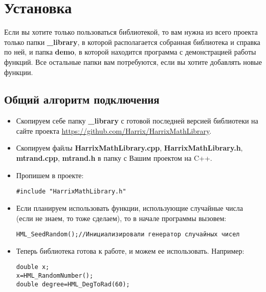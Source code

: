 \newpage
\section{Установка}\label{section_install}

Если вы хотите только пользоваться библиотекой, то вам нужна из всего проекта только папки \textbf{\_library}, в которой располагается собранная библиотека и справка по ней, и папка \textbf{demo}, в которой находится программа с демонстрацией работы функций. Все остальные папки вам потребуются, если вы хотите добавлять новые функции.

\subsection{Общий алгоритм подключения}

\begin{itemize}
\item Скопируем себе папку \textbf{\_library} с готовой последней версией библиотеки на сайте проекта \href{https://github.com/Harrix/HarrixMathLibrary}{https://github.com/Harrix/HarrixMathLibrary}.

\item Скопируем файлы \textbf{HarrixMathLibrary.cpp}, \textbf{HarrixMathLibrary.h}, \textbf{mtrand.cpp}, \textbf{mtrand.h} в папку с Вашим проектом на C++.

\item Пропишем в проекте:
\begin{lstlisting}[label=install_01,caption=Подключение библиотеки]
#include "HarrixMathLibrary.h"
\end{lstlisting}

\item Если планируем использовать функции, использующие случайные числа (если не знаем, то тоже сделаем), то в начале программы вызовем:
\begin{lstlisting}[label=install_02,caption=Инициализация генератора случайных чисел]
HML_SeedRandom();//Инициализировали генератор случайных чисел
\end{lstlisting}

\item Теперь библиотека готова к работе, и можем ее использовать. Например:
\begin{lstlisting}[label=install_03,caption=Пример использования]
double x;
x=HML_RandomNumber();
double degree=HML_DegToRad(60);
\end{lstlisting}
\end{itemize}


